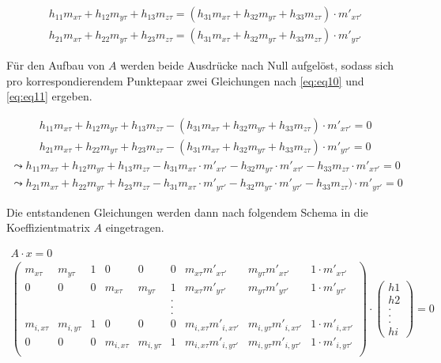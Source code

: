
\begin{gather}
	h_{11}m_{x\tau}+h_{12}m_{y\tau}+h_{13}m_{z\tau}= (h_{31}m_{x\tau}+h_{32}m_{y\tau}+h_{33}m_{z\tau}) \cdot m'_{x\tau'}\\
	h_{21}m_{x\tau}+h_{22}m_{y\tau}+h_{23}m_{z\tau}= (h_{31}m_{x\tau}+h_{32}m_{y\tau}+h_{33}m_{z\tau}) \cdot m'_{y\tau'}
\end{gather}

Für den Aufbau von $A$ werden beide Ausdrücke nach Null aufgelöst, sodass sich pro korrespondierendem Punktepaar zwei Gleichungen nach \ref{eq:eq10} und \ref{eq:eq11} ergeben.

\begin{gather*}
	h_{11}m_{x\tau}+h_{12}m_{y\tau}+h_{13}m_{z\tau} -(h_{31}m_{x\tau}+h_{32}m_{y\tau}+h_{33}m_{z\tau}) \cdot m'_{x\tau'}= 0 \\	h_{21}m_{x\tau}+h_{22}m_{y\tau}+h_{23}m_{z\tau}-(h_{31}m_{x\tau}+h_{32}m_{y\tau}+h_{33}m_{z\tau}) \cdot m'_{y\tau'}=0
\end{gather*}
\begin{gather}
	\leadsto h_{11}m_{x\tau}+h_{12}m_{y\tau}+h_{13}m_{z\tau} -h_{31}m_{x\tau}\cdot m'_{x\tau'} - h_{32}m_{y\tau} \cdot m'_{x\tau'}-h_{33}m_{z\tau}\cdot m'_{x\tau'}= 0 \label{eq:eq10}\\
	\leadsto h_{21}m_{x\tau}+h_{22}m_{y\tau}+h_{23}m_{z\tau}-h_{31}m_{x\tau}\cdot m'_{y\tau'} -h_{32}m_{y\tau} \cdot m'_{y\tau'} -h_{33}m_{z\tau}) \cdot m'_{y\tau'}=0 \label{eq:eq11}
\end{gather}

Die entstandenen Gleichungen werden dann nach folgendem Schema in die Koeffizientmatrix $A$ eingetragen.\cite{Elements,HZ,Schwarz,Heipke}

\begin{gather}
		A\cdot x = 0\\
	\begin{pmatrix}
		m_{x\tau}&m_{y\tau}&1&0&0&0&m_{x\tau} m'_{x\tau'}&m_{y\tau} m'_{x\tau'} & 1\cdot m'_{x\tau'}\\
		0&0&0&m_{x\tau}&m_{y\tau}&1&m_{x\tau} m'_{y\tau'}&m_{y\tau} m'_{y\tau'} & 1\cdot m'_{y\tau'}\\
		&&&&&.&&&\\	
		&&&&&.&&&\\	
		&&&&&.&&&\\	
		m_{i,x\tau}&m_{i,y\tau}&1&0&0&0&m_{i,x\tau} m'_{i,x\tau'}&m_{i,y\tau} m'_{i,x\tau'} & 1\cdot m'_{i,x\tau'}\\
		0&0&0&m_{i,x\tau}&m_{i,y\tau}&1&m_{i,x\tau} m'_{i,y\tau'}&m_{i,y\tau} m'_{i,y\tau'} & 1\cdot m'_{i,y\tau'}\\
	\end{pmatrix}
	\cdot
	\begin{pmatrix}
		h1\\h2\\.\\.\\.\\hi
	\end{pmatrix}
	=0
\end{gather}

